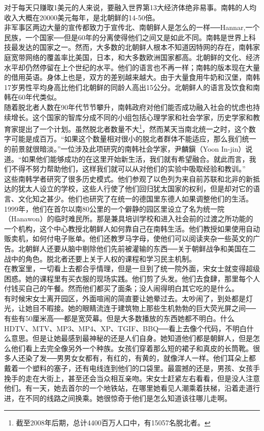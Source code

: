 对于每天只赚取1美元的人来说，要融入世界第13大经济体绝非易事。南韩的人均收入大概在20000美元每年，是北朝鲜的14-50倍。\\

非军事区两边大量的宣传都致力于宣传北、南朝鲜人是怎么的一样──Hannar,一个民族，一个国家──但是60年的分离使得他们之间又是如此不同。南韩是世界上科技最发达的国家之一。然而，大多数的北朝鲜人根本不知道因特网的存在，南韩家庭宽带网络的覆盖率比美国，日本，和大多数欧洲国家都高。北朝鲜的文化、经济水平却仍然停留在上个世纪的水平。他们的语言也不再一样；南韩的版本现在大量的借用英语。身体上也是，双方的差别越来越大。由于大量食用牛奶和汉堡，南韩17岁男性平均身高比他们北朝鲜的同龄人高出15公分。北朝鲜人的语言及饮食和南韩在60年代类似。\\

随着脱北者人数在90年代节节攀升，南韩政府对他们能否成功融入社会的忧虑也持续增长。这个国家的智库分成不同的小组包括心理学家和社会学家，历史学家和教育家提出了一个计划。虽然脱北者数量不大\footnote{截至2008年后期，总计4400百万人口中，有15057名脱北者。}，然而某天当南北统一之时，这个数字可能是成百万。“如果这个数量相对很小的脱北者群体不能适应，那么我们统一的前景就很暗淡。”一位涉及此项研究的南韩社会学家，尹麟鎭（Yoon In-jin）说道。“如果他们能够成功的在这里开始新生活，我们就有希望融合。就此而言，我们不得不努力帮助他们，这样我们就可以从对他们的实验中吸取经验和教训。”\\

这些南韩学者研究了很多历史模式。他们参观了以色列为来自前苏联和北非的新抵达的犹太人设立的学校，这些人行使了他们回归犹太国家的权利，但是却对它的语言、文化知之甚少。他们也研究了在统一的德国里东德人如果调整他们的生活。\\

1999年，他们在首尔以南80公里的一个僻静的园区里设立了名为统一院（Hanawon）的临时难民所。那是兼具培训学校和进入社会前的过渡之所功能的一个机构，这个中心教授北朝鲜人如何靠自己在南韩生活。他们教授如果使用自动贩卖机，如何付电子账单。他们还教罗马字母，使他们可以阅读夹杂一些英文的广告。北朝鲜人还要从脑中剔除他们先前被灌输的东西──关于朝鲜战争和美国在二战中的角色。脱北者还要上关于人权的课程和学习民主机制。\\

在教室里，一切看上去都合乎情理，但是一旦到了统一院外面，宋女士就变得超级困惑。她的课程里有买衣服的现场实践。他们剪了头发。他们去食肆，那里每个人付钱买自己的午餐。然而他们都买了面条；没人闹得明白其它吃的是什么。\\

有时候宋女士离开园区，外面喧闹的简直要让她晕过去。太吵闹了，到处都是灯光，让她目不暇接。她的眼睛流连于建筑物上那些生机勃勃的巨大荧光屏之间──有些有50厘米高──都是宽荧幕。但是大多数播放的东西她都不明白。什么HDTV、MTV、MP3、MP4、XP、TGIF、BBQ──看上去像个代码，不明白什么意思。但是让她最感到最神秘的还是人们自身。她知道他们都是朝鲜人，但是怎么他们看上去完全像另外一个种族。女孩们穿着那么短的裙子和真皮的长筒靴。很多人还染了发──男男女女都有，有红的，有黄的，就像洋人一样。他们耳朵上都戴着一个塑料的塞子，还有电线连到他们的口袋里。最震撼的还是，男孩、女孩手挽手的走在大街上，甚至还会当众相互亲吻。宋女士赶紧左右看看，但是没人注意他们。有一天，她去首尔的一个地铁站，在哪里她看见人潮乘着扶梯，沿着走道行进，在不同的线路之间换乘。她很惊奇于他们是怎么知道该往哪儿走啊。\\

